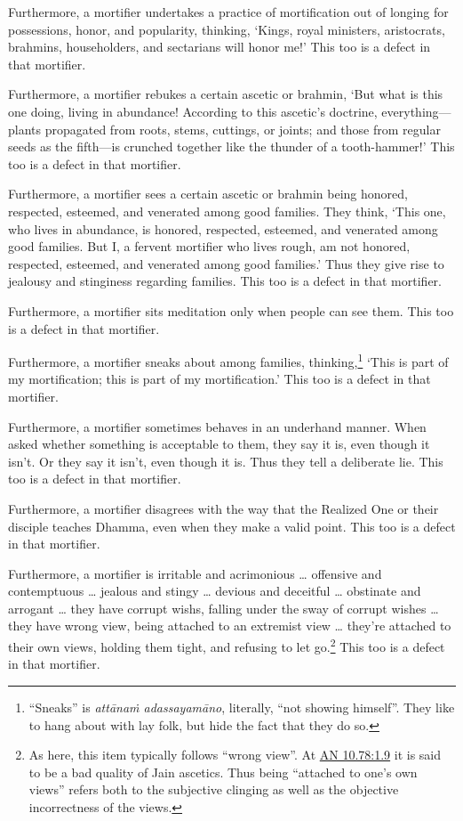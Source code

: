 \documentclass[12pt,openany]{book}%
\begin{document}
Furthermore, a mortifier undertakes a practice of mortification out of longing for possessions, honor, and popularity, thinking, ‘Kings, royal ministers, aristocrats, brahmins, householders, and sectarians will honor me!’ This too is a defect in that mortifier. 

Furthermore, a mortifier rebukes a certain ascetic or brahmin, ‘But what is this one doing, living in abundance! According to this ascetic’s doctrine, everything—plants propagated from roots, stems, cuttings, or joints; and those from regular seeds as the fifth—is crunched together like the thunder of a tooth-hammer!’ This too is a defect in that mortifier. 

Furthermore, a mortifier sees a certain ascetic or brahmin being honored, respected, esteemed, and venerated among good families. They think, ‘This one, who lives in abundance, is honored, respected, esteemed, and venerated among good families. But I, a fervent mortifier who lives rough, am not honored, respected, esteemed, and venerated among good families.’ Thus they give rise to jealousy and stinginess regarding families. This too is a defect in that mortifier. 

Furthermore, a mortifier sits meditation only when people can see them. This too is a defect in that mortifier. 

Furthermore, a mortifier sneaks about among families, thinking,\footnote{“Sneaks” is \textit{\textsanskrit{attānaṁ} \textsanskrit{adassayamāno}}, literally, “not showing himself”. They like to hang about with lay folk, but hide the fact that they do so. } ‘This is part of my mortification; this is part of my mortification.’ This too is a defect in that mortifier. 

Furthermore, a mortifier sometimes behaves in an underhand manner. When asked whether something is acceptable to them, they say it is, even though it isn’t. Or they say it isn’t, even though it is. Thus they tell a deliberate lie. This too is a defect in that mortifier. 

Furthermore, a mortifier disagrees with the way that the Realized One or their disciple teaches Dhamma, even when they make a valid point. This too is a defect in that mortifier. 

Furthermore, a mortifier is irritable and acrimonious … offensive and contemptuous … jealous and stingy … devious and deceitful … obstinate and arrogant … they have corrupt wishs, falling under the sway of corrupt wishes … they have wrong view, being attached to an extremist view … they’re attached to their own views, holding them tight, and refusing to let go.\footnote{As here, this item typically follows “wrong view”. At \href{https://suttacentral.net/an10.78/en/sujato\#1.9}{AN 10.78:1.9} it is said to be a bad quality of Jain ascetics. Thus being “attached to one’s own views” refers both to the subjective clinging as well as the objective incorrectness of the views. } This too is a defect in that mortifier. 
\end{document}
